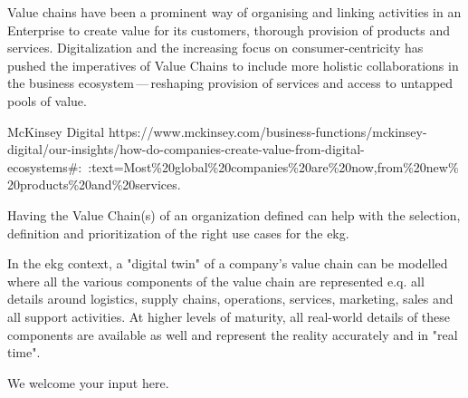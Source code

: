 %
%

Value chains have been a prominent way of organising and linking activities in an Enterprise to create value
for its customers, thorough provision of products and services.
Digitalization and the increasing focus on consumer-centricity
has pushed the imperatives of Value Chains to include more holistic collaborations in the
business ecosystem\,---\,reshaping provision of services and access to untapped pools of value.

{McKinsey Digital}
{https://www.mckinsey.com/business-functions/mckinsey-digital/our-insights/how-do-companies-create-value-from-digital-ecosystems\#:~:text=Most\%20global\%20companies\%20are\%20now,from\%20new\%20products\%20and\%20services.}

\ekgmmContextSection

\ekgmmHowEKGRequiresThisCapability

Having the Value Chain(s) of an organization defined can help with the selection, definition and prioritization of
the right use cases for the \gls{ekg}.

\ekgmmHowEKGAffectsThisCapability

In the \gls{ekg} context, a "digital twin" of a company's value chain can be modelled where all the various components
of the value chain are represented e.q. all details around logistics, supply chains, operations, services, marketing,
sales and all support activities.
At higher levels of maturity, all real-world details of these components are available as well and represent
the reality accurately and in "real time".

We welcome your input here.

